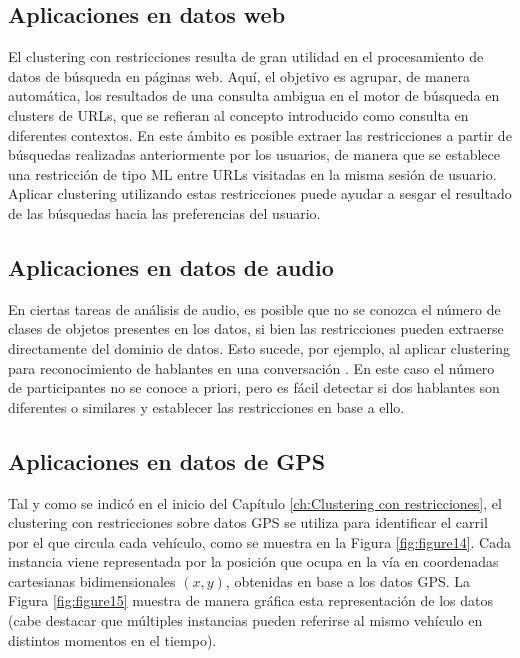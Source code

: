 \subsection{Aplicaciones en datos web} 

El clustering con restricciones resulta de gran utilidad en el procesamiento de datos de búsqueda en páginas web. Aquí, el objetivo es agrupar, de manera automática, los resultados de una consulta ambigua en el motor de búsqueda en clusters de \acs{URL}s, que se refieran al concepto introducido como consulta en diferentes contextos. En este ámbito es posible extraer las restricciones a partir de búsquedas realizadas anteriormente por los usuarios, de manera que se establece una restricción de tipo \acf{ML} entre \acs{URL}s visitadas en la misma sesión de usuario. Aplicar clustering utilizando estas restricciones puede ayudar a sesgar el resultado de las búsquedas hacia las preferencias del usuario.

\subsection{Aplicaciones en datos de audio}

En ciertas tareas de análisis de audio, es posible que no se conozca el número de clases de objetos presentes en los datos, si bien las restricciones pueden extraerse directamente del dominio de datos. Esto sucede, por ejemplo, al aplicar clustering para reconocimiento de hablantes en una conversación \cite{BarHillel:2003}. En este caso el número de participantes no se conoce a priori, pero es fácil detectar si dos hablantes son diferentes o similares y establecer las restricciones en base a ello.

\subsection{Aplicaciones en datos de GPS} \label{EjemploGPS}

Tal y como se indicó en el inicio del Capítulo \ref{ch:Clustering con restricciones}, el clustering con restricciones sobre datos \acs{GPS} se utiliza para identificar el carril por el que circula cada vehículo, como se muestra en la Figura \ref{fig:figure14}. Cada instancia viene representada por la posición que ocupa en la vía en coordenadas cartesianas bidimensionales $(x,y)$, obtenidas en base a los datos \acs{GPS}. La Figura \ref{fig:figure15} muestra de manera gráfica esta representación de los datos (cabe destacar que múltiples instancias pueden referirse al mismo vehículo en distintos momentos en el tiempo).

